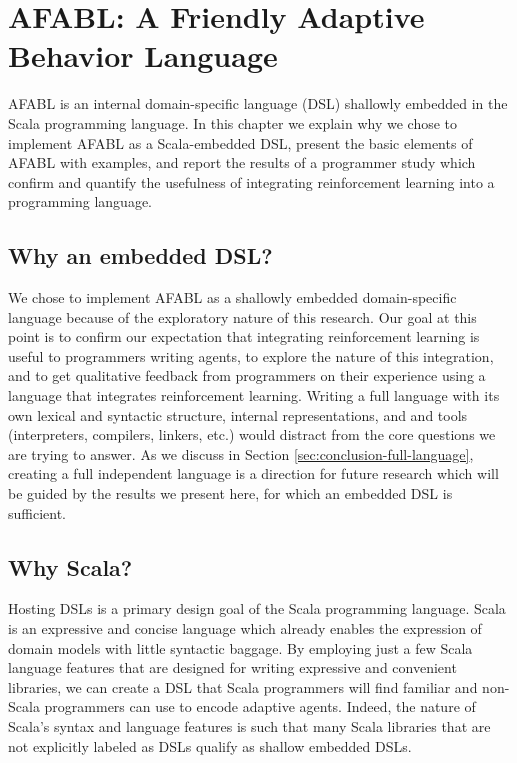 \chapter{AFABL: A Friendly Adaptive Behavior Language}\label{ch:afabl}

AFABL is an internal domain-specific language (DSL) shallowly embedded in the Scala programming language. In this chapter we explain why we chose to implement AFABL as a Scala-embedded DSL, present the basic elements of AFABL with examples, and report the results of a programmer study which confirm and quantify the usefulness of integrating reinforcement learning into a programming language.

\section{Why an embedded DSL?}

We chose to implement AFABL as a shallowly embedded domain-specific language because of the exploratory nature of this research. Our goal at this point is to confirm our expectation that integrating reinforcement learning is useful to programmers writing agents, to explore the nature of this integration, and to get qualitative feedback from programmers on their experience using a language that integrates reinforcement learning. Writing a full language with its own lexical and syntactic structure, internal representations, and and tools (interpreters, compilers, linkers, etc.) would distract from the core questions we are trying to answer. As we discuss in Section \ref{sec:conclusion-full-language}, creating a full independent language is a direction for future research which will be guided by the results we present here, for which an embedded DSL is sufficient.

\section{Why Scala?}

Hosting DSLs is a primary design goal of the Scala programming language. Scala is an expressive and concise language which already enables the expression of domain models with little syntactic baggage. By employing just a few Scala language features that are designed for writing expressive and convenient libraries, we can create a DSL that Scala programmers will find familiar and non-Scala programmers can use to encode adaptive agents. Indeed, the nature of Scala's syntax and language features is such that many Scala libraries that are not explicitly labeled as DSLs qualify as shallow embedded DSLs.


